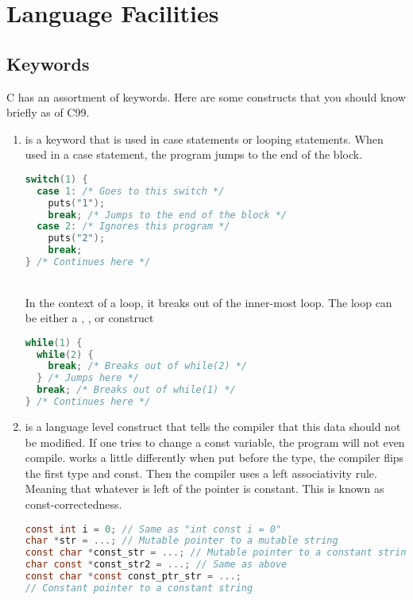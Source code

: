 \section{Language Facilities}

\subsection{Keywords}

C has an assortment of keywords. Here are some constructs that you should know briefly as of C99.

\begin{enumerate}
	\item {} is a keyword that is used in case statements or looping statements. When used in a case statement, the program jumps to the end of the block.
	      \\
	      \begin{lstlisting}[language=C]
switch(1) {
  case 1: /* Goes to this switch */
    puts("1");
    break; /* Jumps to the end of the block */
  case 2: /* Ignores this program */
    puts("2");
    break;
} /* Continues here */
\end{lstlisting}
	      \\
	      In the context of a loop, it breaks out of the inner-most loop. The loop can be either a , , or  construct
	      \\
	      \begin{lstlisting}[language=C]
while(1) {
  while(2) {
    break; /* Breaks out of while(2) */
  } /* Jumps here */
  break; /* Breaks out of while(1) */
} /* Continues here */
\end{lstlisting}
	\item {} is a language level construct that tells the compiler that this data should not be modified. If one tries to change a const variable, the program will not even compile.  works a little differently when put before the type, the compiler flips the first type and const. Then the compiler uses a left associativity rule. Meaning that whatever is left of the pointer is constant. This is known as const-correctedness.
	      \\
	      \begin{lstlisting}[language=C]
const int i = 0; // Same as "int const i = 0"
char *str = ...; // Mutable pointer to a mutable string
const char *const_str = ...; // Mutable pointer to a constant string
char const *const_str2 = ...; // Same as above
const char *const const_ptr_str = ...;
// Constant pointer to a constant string
\end{lstlisting}


\end{enumerate}
